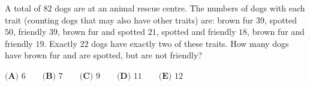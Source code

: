 A total of $82$ dogs are at an animal rescue centre. The numbers of dogs with each trait (counting dogs that may also have other traits) are: brown fur $39$, spotted $50$, friendly $39$, brown fur and spotted $21$, spotted and friendly $18$, brown fur and friendly $19$. Exactly $22$ dogs have exactly two of these traits. How many dogs have brown fur and are spotted, but are not friendly?

$\textbf{(A) }6\qquad\textbf{(B) }7\qquad\textbf{(C) }9\qquad\textbf{(D) }11\qquad\textbf{(E) }12$
